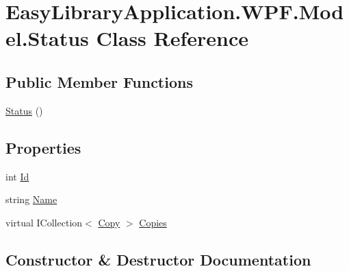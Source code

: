 \hypertarget{class_easy_library_application_1_1_w_p_f_1_1_model_1_1_status}{}\section{Easy\+Library\+Application.\+W\+P\+F.\+Model.\+Status Class Reference}
\label{class_easy_library_application_1_1_w_p_f_1_1_model_1_1_status}
\subsection*{Public Member Functions}
\begin{DoxyCompactItemize}
\item 
\mbox{\hyperlink{class_easy_library_application_1_1_w_p_f_1_1_model_1_1_status_ac1941f8095c9968293517355b9ff05e3}{Status}} ()
\end{DoxyCompactItemize}
\subsection*{Properties}
\begin{DoxyCompactItemize}
\item 
int \mbox{\hyperlink{class_easy_library_application_1_1_w_p_f_1_1_model_1_1_status_a9d7dbc8fca8dafba679a71d58b0eeb44}{Id}}
\item 
string \mbox{\hyperlink{class_easy_library_application_1_1_w_p_f_1_1_model_1_1_status_aa324b8fa54e1d10461f7d4f82833f94a}{Name}}
\item 
virtual I\+Collection$<$ \mbox{\hyperlink{class_easy_library_application_1_1_w_p_f_1_1_model_1_1_copy}{Copy}} $>$ \mbox{\hyperlink{class_easy_library_application_1_1_w_p_f_1_1_model_1_1_status_a28924a2afa31f9b77ea7b87d6b86f10c}{Copies}}
\end{DoxyCompactItemize}


\subsection{Constructor \& Destructor Documentation}
\mbox{\label{class_easy_library_application_1_1_w_p_f_1_1_model_1_1_status_ac1941f8095c9968293517355b9ff05e3}} 
